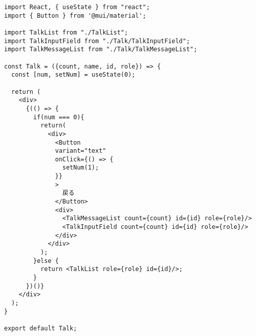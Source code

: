 \begin{verbatim}
import React, { useState } from "react";
import { Button } from '@mui/material';

import TalkList from "./TalkList";
import TalkInputField from "./Talk/TalkInputField";
import TalkMessageList from "./Talk/TalkMessageList";

const Talk = ({count, name, id, role}) => {
  const [num, setNum] = useState(0);

  return (
    <div>
      {(() => {
        if(num === 0){
          return(
            <div>
              <Button
              variant="text"
              onClick={() => {
                setNum(1);
              }}
              >
                戻る
              </Button>
              <div>
                <TalkMessageList count={count} id={id} role={role}/>
                <TalkInputField count={count} id={id} role={role}/>
              </div>
            </div>
          );
        }else {
          return <TalkList role={role} id={id}/>;
        }
      })()}
    </div>
  );
}

export default Talk;
\end{verbatim}